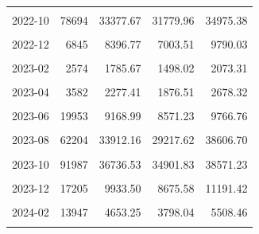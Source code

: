 \begin{longtable}[t]{crrrr}
\cellcolor{gray!10}{2022-09} & \cellcolor{gray!10}{159128} & \cellcolor{gray!10}{59991.64} & \cellcolor{gray!10}{57530.60} & \cellcolor{gray!10}{62452.68}\\
2022-10 & 78694 & 33377.67 & 31779.96 & 34975.38\\
\cellcolor{gray!10}{2022-11} & \cellcolor{gray!10}{26949} & \cellcolor{gray!10}{17412.70} & \cellcolor{gray!10}{16021.09} & \cellcolor{gray!10}{18804.30}\\
2022-12 & 6845 & 8396.77 & 7003.51 & 9790.03\\
\cellcolor{gray!10}{2023-01} & \cellcolor{gray!10}{3026} & \cellcolor{gray!10}{2807.75} & \cellcolor{gray!10}{2409.63} & \cellcolor{gray!10}{3205.87}\\
2023-02 & 2574 & 1785.67 & 1498.02 & 2073.31\\
\cellcolor{gray!10}{2023-03} & \cellcolor{gray!10}{3623} & \cellcolor{gray!10}{2327.61} & \cellcolor{gray!10}{2031.65} & \cellcolor{gray!10}{2623.58}\\
2023-04 & 3582 & 2277.41 & 1876.51 & 2678.32\\
\cellcolor{gray!10}{2023-05} & \cellcolor{gray!10}{10992} & \cellcolor{gray!10}{5620.58} & \cellcolor{gray!10}{5167.50} & \cellcolor{gray!10}{6073.66}\\
2023-06 & 19953 & 9168.99 & 8571.23 & 9766.76\\
\cellcolor{gray!10}{2023-07} & \cellcolor{gray!10}{23230} & \cellcolor{gray!10}{14755.22} & \cellcolor{gray!10}{12679.64} & \cellcolor{gray!10}{16830.79}\\
2023-08 & 62204 & 33912.16 & 29217.62 & 38606.70\\
\cellcolor{gray!10}{2023-09} & \cellcolor{gray!10}{88659} & \cellcolor{gray!10}{43011.75} & \cellcolor{gray!10}{40213.72} & \cellcolor{gray!10}{45809.79}\\
2023-10 & 91987 & 36736.53 & 34901.83 & 38571.23\\
\cellcolor{gray!10}{2023-11} & \cellcolor{gray!10}{74850} & \cellcolor{gray!10}{27324.90} & \cellcolor{gray!10}{24193.98} & \cellcolor{gray!10}{30455.82}\\
2023-12 & 17205 & 9933.50 & 8675.58 & 11191.42\\
\cellcolor{gray!10}{2024-01} & \cellcolor{gray!10}{8196} & \cellcolor{gray!10}{3774.09} & \cellcolor{gray!10}{3366.08} & \cellcolor{gray!10}{4182.11}\\
2024-02 & 13947 & 4653.25 & 3798.04 & 5508.46\\
\cellcolor{gray!10}{2024-03} & \cellcolor{gray!10}{16621} & \cellcolor{gray!10}{4780.31} & \cellcolor{gray!10}{4242.88} & \cellcolor{gray!10}{5317.74}\\

\end{longtable}
